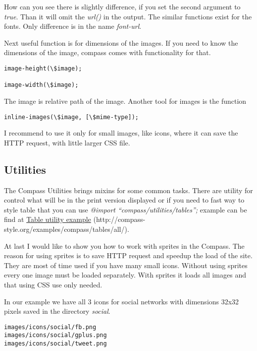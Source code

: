 \documentclass[a4paper,12pt,oneside]{sphinxmanual}
\begin{document}
How can you see there is slightly difference, if you set the second argument to \emph{true}. Than it will omit the \emph{url()} in the output. The similar functions exist for the fonts. Only difference is in the name \emph{font-url}.

Next useful function is for dimensions of the images. If you need to know the dimensions of the image, compass comes with functionality for that.

\begin{Verbatim}[commandchars=\\\{\}]
image-height(\$image);

image-width(\$image);
\end{Verbatim}

The image is relative path of the image. Another tool for images is the function

\begin{Verbatim}[commandchars=\\\{\}]
inline-images(\$image, [\$mime-type]);
\end{Verbatim}

I recommend to use it only for small images, like icons, where it can save the HTTP request, with little larger CSS file.


\subsection{Utilities}
\label{src/compass:utilities}
The Compass Utilities brings mixins for some common tasks. There are utility for control what will be in the print version displayed or if you need to fast way to style table that you can use \emph{@import ``compass/utilities/tables'';} example can be find at \href{http://compass-style.org/examples/compass/tables/all/}{Table utility example} (http://compass-style.org/examples/compass/tables/all/).

At last I would like to show you how to work with sprites in the Compass. The reason for using sprites is to save HTTP request and speedup the load of the site. They are most of time used if you have many small icons. Without using sprites every one image must be loaded separately. With sprites it loads all images and that using CSS use only needed.

In our example we have all 3 icons for social networks with dimensions 32x32 pixels saved in the directory \emph{social}.

\begin{Verbatim}[commandchars=\\\{\}]
images/icons/social/fb.png
images/icons/social/gplus.png
images/icons/social/tweet.png
\end{Verbatim}
\end{document}
